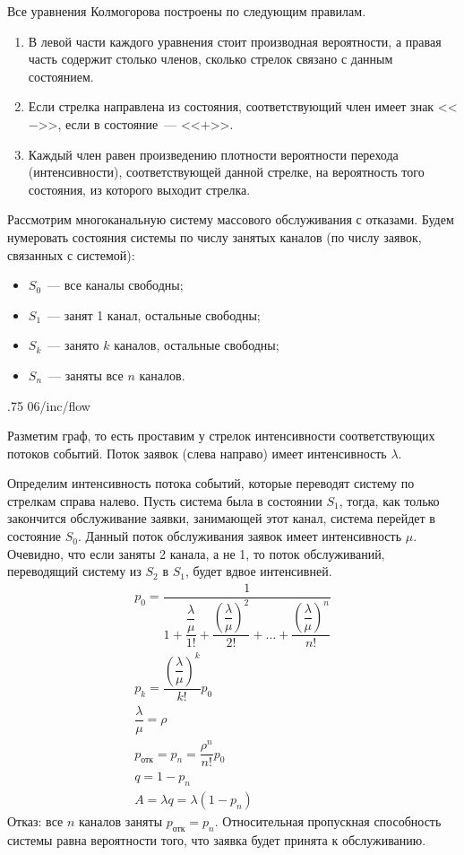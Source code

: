 Все уравнения Колмогорова построены по следующим правилам.

\begin{enumerate}
    \item В левой части каждого уравнения стоит производная вероятности, а правая часть содержит столько членов, сколько стрелок связано с данным состоянием.
    \item Если стрелка направлена из состояния, соответствующий член имеет знак <<$-$>>, если в состояние~--- <<$+$>>.
    \item Каждый член равен произведению плотности вероятности перехода (интенсивности), соответствующей данной стрелке, на вероятность того состояния, из которого выходит стрелка.
\end{enumerate}

Рассмотрим многоканальную систему массового обслуживания с отказами. Будем нумеровать состояния системы по числу занятых каналов (по числу заявок, связанных с системой):

\begin{itemize}
    \item $S_0$~--- все каналы свободны;
    \item $S_1$~--- занят 1 канал, остальные свободны;
    \item $S_k$~--- занято $k$ каналов, остальные свободны;
    \item $S_n$~--- заняты все $n$ каналов.
\end{itemize}

\image
{.75\textwidth}
{06/inc/flow}
{}

Разметим граф, то есть проставим у стрелок интенсивности соответствующих потоков событий. Поток заявок (слева направо) имеет интенсивность $\lambda$.

Определим интенсивность потока событий, которые переводят систему по стрелкам справа налево. Пусть система была в состоянии $S_1$, тогда, как только закончится обслуживание заявки, занимающей этот канал, система перейдет в состояние $S_0$. Данный поток обслуживания заявок имеет интенсивность $\mu$. Очевидно, что если заняты 2 канала, а не 1, то поток обслуживаний, переводящий систему из $S_2$ в $S_1$, будет вдвое интенсивней.
%
\begin{gather*}
    p_0 = \dfrac{1}{1 + \dfrac{\dfrac{\lambda}{\mu}}{1!} + \dfrac{\left(\dfrac{\lambda}{\mu}\right)^2}{2!} + \dots + \dfrac{\left(\dfrac{\lambda}{\mu}\right)^n}{n!}}\\
    p_k = \dfrac{\left(\dfrac{\lambda}{\mu}\right)^k}{k!}p_0\\
    \dfrac{\lambda}{\mu} = \rho\\
    p_{\text{отк}} = p_n = \dfrac{\rho^n}{n!}p_0\\
    q = 1 - p_n\\
    A = \lambda q = \lambda(1 - p_n)
\end{gather*}
%
Отказ: все $n$ каналов заняты ${p_{\text{отк}} = p_n}$. Относительная пропускная способность системы равна вероятности того, что заявка будет принята к обслуживанию.

